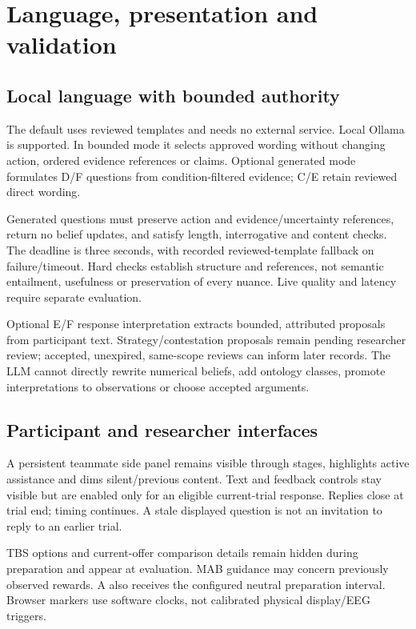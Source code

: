 \documentclass[11pt,a4paper]{article}
\begin{document}
\section{Language, presentation and validation}
\subsection{Local language with bounded authority}
The default uses reviewed templates and needs no external service. Local Ollama is supported. In bounded mode it selects approved wording without changing action, ordered evidence references or claims. Optional generated mode formulates D/F questions from condition-filtered evidence; C/E retain reviewed direct wording.

Generated questions must preserve action and evidence/uncertainty references, return no belief updates, and satisfy length, interrogative and content checks. The deadline is three seconds, with recorded reviewed-template fallback on failure/timeout. Hard checks establish structure and references, not semantic entailment, usefulness or preservation of every nuance. Live quality and latency require separate evaluation.

Optional E/F response interpretation extracts bounded, attributed proposals from participant text. Strategy/contestation proposals remain pending researcher review; accepted, unexpired, same-scope reviews can inform later records. The LLM cannot directly rewrite numerical beliefs, add ontology classes, promote interpretations to observations or choose accepted arguments.

\subsection{Participant and researcher interfaces}
A persistent teammate side panel remains visible through stages, highlights active assistance and dims silent/previous content. Text and feedback controls stay visible but are enabled only for an eligible current-trial response. Replies close at trial end; timing continues. A stale displayed question is not an invitation to reply to an earlier trial.

TBS options and current-offer comparison details remain hidden during preparation and appear at evaluation. MAB guidance may concern previously observed rewards. A also receives the configured neutral preparation interval. Browser markers use software clocks, not calibrated physical display/EEG triggers.
\end{document}
